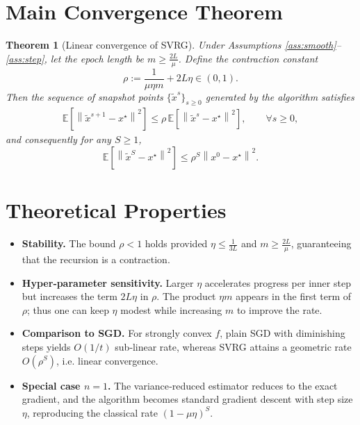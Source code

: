\documentclass[11pt]{article}
\newtheorem{theorem}{Theorem}
\newcommand{\E}{\mathbb{E}}
\newcommand{\norm}[1]{\left\|#1\right\|}
\begin{document}
\section*{Main Convergence Theorem}
\begin{theorem}[Linear convergence of SVRG]\label{thm:linear}
Under Assumptions \ref{ass:smooth}–\ref{ass:step}, let the epoch length be $m\ge \frac{2L}{\mu}$.  
Define the contraction constant
\[
\rho:=\frac{1}{\mu\eta m}+2L\eta\in(0,1).
\]
Then the sequence of snapshot points $\{\tilde{x}^{s}\}_{s\ge0}$ generated by the algorithm satisfies
\begin{align}
\E\!\left[\norm{\tilde{x}^{s+1}-x^{\star}}^{2}\right]
\le \rho\,\E\!\left[\norm{\tilde{x}^{s}-x^{\star}}^{2}\right],
\qquad\forall s\ge0,
\end{align}
and consequently for any $S\ge1$,
\[
\E\!\left[\norm{\tilde{x}^{S}-x^{\star}}^{2}\right]\le \rho^{S}\norm{x^{0}-x^{\star}}^{2}.
\]
\end{theorem}

\section*{Theoretical Properties}
\begin{itemize}[leftmargin=*]
\item \textbf{Stability.} The bound $\rho<1$ holds provided $\eta\le \frac{1}{3L}$ and $m\ge \frac{2L}{\mu}$, guaranteeing that the recursion is a contraction.
\item \textbf{Hyper‑parameter sensitivity.} Larger $\eta$ accelerates progress per inner step but increases the term $2L\eta$ in $\rho$. The product $\eta m$ appears in the first term of $\rho$; thus one can keep $\eta$ modest while increasing $m$ to improve the rate.
\item \textbf{Comparison to SGD.} For strongly convex $f$, plain SGD with diminishing steps yields $O(1/t)$ sub‑linear rate, whereas SVRG attains a geometric rate $O(\rho^{S})$, i.e. linear convergence.
\item \textbf{Special case $n=1$.} The variance‑reduced estimator reduces to the exact gradient, and the algorithm becomes standard gradient descent with step size $\eta$, reproducing the classical rate $(1-\mu\eta)^{S}$.
\end{itemize}
\end{document}
